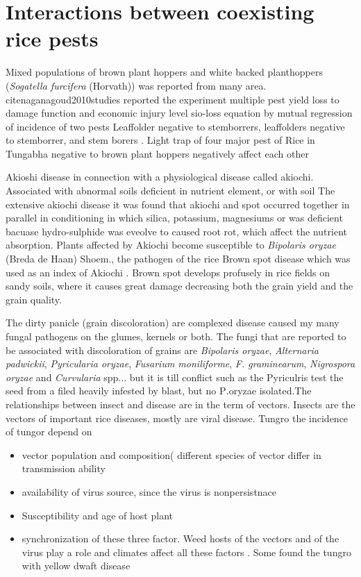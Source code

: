 \section*{Interactions between coexisting rice pests}

Mixed populations of brown plant hoppers and white backed planthoppers (\textit{Sogatella furcifera} (Horvath)) was reported from many area. cite{naganagoud2010studies} reported the experiment multiple pest yield loss to damage function and economic injury level sio-loss equation by mutual regression of incidence of two pests Leaffolder negative to stemborrers, leaffolders negative to stemborrer, and stem borers \cite{selvaraj2012determination}. Light trap of four major pest of Rice in Tungabha negative to brown plant hoppers negatively affect each other\

Akioshi disease in connection with a physiological disease called akiochi.  Associated with abnormal soils deficient in nutrient element, or with soil  The extensive akiochi disease it was found that akiochi and spot occurred together in parallel in conditioning in which silica, potassium, magnesiums or  was deficient bacuase hydro-sulphide was eveolve to caused root rot, which affect the nutrient absorption. Plants affected by Akiochi become susceptible to \textit{Bipolaris oryzae} (Breda de Haan) Shoem., the pathogen of the rice Brown spot disease which was used as an index of Akiochi \cite{ouricedisease}. Brown spot develops profusely in rice fields on sandy soils, where it causes great damage decreasing both the grain yield and the grain quality.

The dirty panicle (grain discoloration) are complexed disease caused my many fungal pathogens on the glumes, kernels or both. The fungi that are reported to be associated with discoloration of grains are \textit{Bipolaris oryzae}, \textit{Alternaria padwickii}, \textit{Pyricularia oryzae}, \textit{Fusarium moniliforme}, \textit{F. graminearum}, \textit{Nigrospora oryzae} and \textit{Curvularia} spp..\cite{ouricedisease}. but it is till conflict such as the Pyriculris test the seed from a filed heavily infested by blast, but no P\textit.{oryzae} isolated.The relationships between insect and disease are in the term of vectors. Insects are the vectors of important rice diseases, mostly are viral disease. Tungro the incidence of tungor depend on 
\begin{itemize}
\item vector population and composition( different species of vector differ in transmission ability 
\item availability of virus source, since the virus is nonpersistnace
\item Susceptibility and age of host plant 
\item synchronization of these three factor. 
Weed hosts of the vectors and of the virus play a role and climates affect all these factors \cite{naganagoud2010studies}. Some found the tungro with yellow dwaft disease \cite{ouricedisease}
\end{itemize}

